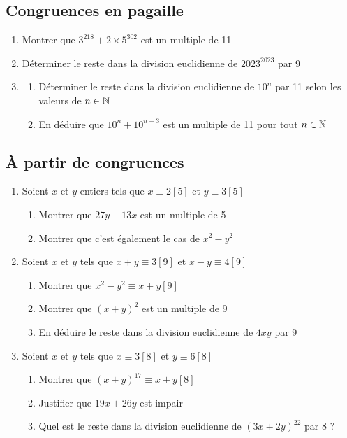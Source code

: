 \documentclass[oneside,12pt]{book}          %
\begin{document}
\subsection{Congruences en pagaille}
\begin{enumerate}
    \item Montrer que $3^{218}+2\times5^{302}$ est un multiple de 11
    \item Déterminer le reste dans la division euclidienne de $2023^{2023}$ par 9
    \item \begin{enumerate}
        \item Déterminer le reste dans la division euclidienne de $10^n$ par 11 selon les valeurs de ${n\in\mathbb N}$
        \item En déduire que $10^n+10^{n+3}$ est un multiple de 11 pour tout ${n\in\mathbb N}$
    \end{enumerate}
\end{enumerate}



\subsection{À partir de congruences}

\begin{enumerate}
    \item Soient $x$ et $y$ entiers tels que $x\equiv2[5]$ et $y\equiv3[5]$
    \begin{enumerate}
        \item Montrer que $27y-13x$ est un multiple de 5
        \item Montrer que c'est également le cas de $x^2-y^2$
    \end{enumerate}
    \item Soient $x$ et $y$ tels que $x+y\equiv3[9]$ et $x-y\equiv4[9]$
    \begin{enumerate}
        \item Montrer que $x^2-y^2\equiv x+y[9]$
        \item Montrer que $(x+y)^2$ est un multiple de 9
        \item En déduire le reste dans la division euclidienne de $4xy$ par 9
    \end{enumerate}
    
    \item Soient $x$ et $y$ tels que $x\equiv3[8]$ et $y\equiv6[8]$
    \begin{enumerate}
        \item Montrer que $(x+y)^{17}\equiv x+y [8]$
        \item Justifier que $19x+26y$ est impair
        \item Quel est le reste dans la division euclidienne de $(3x+2y)^{22}$ par 8 ?
    \end{enumerate}
\end{enumerate}
\end{document}
